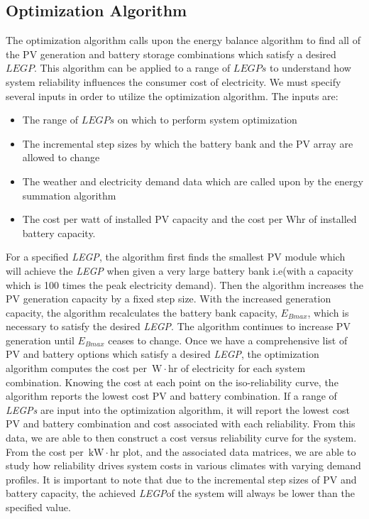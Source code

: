 \documentclass[11p]{article}
\newcommand{\unit}[1]{\ensuremath{\, \mathrm{#1}}}
\begin{document}
\subsection{Optimization Algorithm}

The optimization algorithm calls upon the energy balance algorithm to find all of the PV generation and battery storage combinations which satisfy a desired $LEGP$. This algorithm can be applied to a range of $LEGPs$ to understand how system reliability influences the consumer cost of electricity. We must specify several inputs in order to utilize the optimization algorithm. The inputs are:

\begin{itemize}

\setlength{\itemsep}{1pt}%
\item The range of $LEGPs$ on which to perform system optimization
\item The incremental step sizes by which the battery bank and the PV array are allowed to change
\item The weather and electricity demand data which are called upon by the energy summation algorithm
\item The cost per watt of installed PV capacity and the cost per Whr of installed battery capacity. 
\end{itemize}

For a specified \emph{LEGP}, the algorithm first finds the smallest PV module which will achieve the \emph{LEGP} when given a very large battery bank i.e(with a capacity which is 100 times the peak electricity demand). 
Then the algorithm increases the PV generation capacity by a fixed step size.
With the increased generation capacity, the algorithm recalculates the battery bank capacity, $E_{Bmax}$, which is necessary to satisfy the desired \emph{LEGP}.
The algorithm continues to increase PV generation until $E_{Bmax}$ ceases to change. 
Once we have a comprehensive list of PV and battery options which satisfy a desired \emph{LEGP}, the optimization algorithm computes the cost per \unit{W \! \cdot \!hr} of electricity for each system combination. 
Knowing the cost at each point on the iso-reliability curve, the algorithm reports the lowest cost PV and battery combination. 
If a range of \emph{LEGPs} are input into the optimization algorithm, it will report the lowest cost PV and battery combination and cost associated with each reliability. 
From this data, we are able to then construct a cost versus reliability curve for the system. 
From the cost per \unit{kW \! \cdot \! hr} plot, and the associated data matrices, we are able to study how reliability drives system costs in various climates with varying demand profiles. 
It is important to note that due to the incremental step sizes of PV and battery capacity, the achieved \emph{LEGP}of the system will always be lower than the specified value. 
\end{document}
